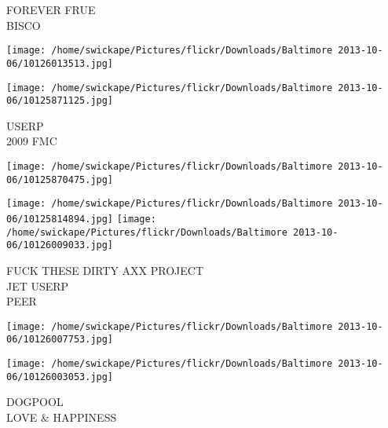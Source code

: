 \documentclass[10pt,letterpaper]{article}
\begin{document}
FOREVER FRUE\\
BISCO\\
\pagebreak

\texttt{[image: /home/swickape/Pictures/flickr/Downloads/Baltimore 2013-10-06/10126013513.jpg]}

\vspace{0.25in}
\texttt{[image: /home/swickape/Pictures/flickr/Downloads/Baltimore 2013-10-06/10125871125.jpg]}

USERP\\
2009 FMC\\
\pagebreak

\texttt{[image: /home/swickape/Pictures/flickr/Downloads/Baltimore 2013-10-06/10125870475.jpg]}

\vspace{0.25in}
\texttt{[image: /home/swickape/Pictures/flickr/Downloads/Baltimore 2013-10-06/10125814894.jpg]}
\texttt{[image: /home/swickape/Pictures/flickr/Downloads/Baltimore 2013-10-06/10126009033.jpg]}

FUCK THESE DIRTY AXX PROJECT\\
JET USERP\\
PEER\\
\pagebreak

\texttt{[image: /home/swickape/Pictures/flickr/Downloads/Baltimore 2013-10-06/10126007753.jpg]}

\vspace{0.25in}
\texttt{[image: /home/swickape/Pictures/flickr/Downloads/Baltimore 2013-10-06/10126003053.jpg]}

DOGPOOL\\
LOVE \& HAPPINESS\\
\pagebreak
\end{document}
